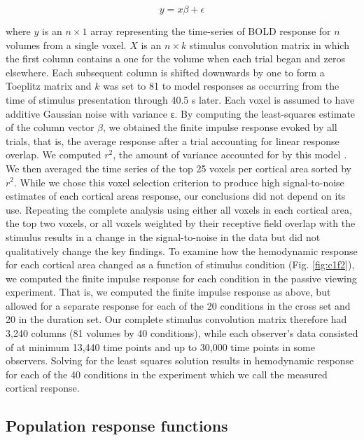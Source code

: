 \documentclass{report}
\begin{document}
\begin{equation}
    y=x\beta+\epsilon
\end{equation}

where $y$ is an $n\times 1$ array representing the time-series of BOLD response for $n$ volumes from a single voxel. $X$ is an $n\times k$ stimulus convolution matrix in which the first column contains a one for the volume when each trial began and zeros elsewhere. Each subsequent column is shifted downwards by one to form a Toeplitz matrix and $k$ was set to 81 to model responses as occurring from the time of stimulus presentation through 40.5 s later. Each voxel is assumed to have additive Gaussian noise with variance ε. By computing the least-squares estimate of the column vector $\beta$, we obtained the finite impulse response evoked by all trials, that is, the average response after a trial accounting for linear response overlap. We computed $r^2$, the amount of variance accounted for by this model \citep{Gardner2005-pg}. We then averaged the time series of the top 25 voxels per cortical area sorted by $r^2$. While we chose this voxel selection criterion to produce high signal-to-noise estimates of each cortical areas response, our conclusions did not depend on its use. Repeating the complete analysis using either all voxels in each cortical area, the top two voxels, or all voxels weighted by their receptive field overlap with the stimulus results in a change in the signal-to-noise in the data but did not qualitatively change the key findings.
To examine how the hemodynamic response for each cortical area changed as a function of stimulus condition (Fig. \ref{fig:c1f2}), we computed the finite impulse response for each condition in the passive viewing experiment. That is, we computed the finite impulse response as above, but allowed for a separate response for each of the 20 conditions in the cross set and 20 in the duration set. Our complete stimulus convolution matrix therefore had 3,240 columns (81 volumes by 40 conditions), while each observer’s data consisted of at minimum 13,440 time points and up to 30,000 time points in some observers. Solving for the least squares solution results in hemodynamic response for each of the 40 conditions in the experiment which we call the measured cortical response.

\subsection{Population response functions}
\end{document}
